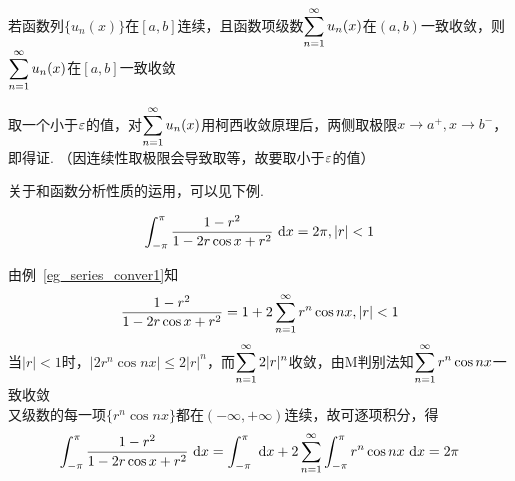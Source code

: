 \begin{example}
若函数列$\{u_n(x)\}$在$[a,b]$连续，且函数项级数$\displaystyle\sum_{n=1}^{\infty}u_n(x)$在$(a,b)$一致收敛，则$\displaystyle\sum_{n=1}^{\infty}u_n(x)$在$[a,b]$一致收敛
\end{example}
\begin{analysis}
取一个小于$\varepsilon$的值，对$\displaystyle\sum_{n=1}^{\infty}u_n(x)$用柯西收敛原理后，两侧取极限$x\to a^+,x\to b^-$，即得证. （因连续性取极限会导致取等，故要取小于$\varepsilon$的值）
\end{analysis}
\par 关于和函数分析性质的运用，可以见下例.
\begin{example}
\[\displaystyle\int_{-\pi}^{\pi}{\dfrac{1-r^2}{1-2r\cos x+r^2}}\,\,\mathrm{d} x=2\pi,|r|<1\]
\end{example}
\begin{analysis}
由例~\ref{eg_series_conver1}知
\[\dfrac{1-r^2}{1-2r\cos x+r^2}=1+2\displaystyle\sum_{n=1}^{\infty}r^n\cos nx,|r|<1\]
当$|r|<1$时，$|2r^n\cos nx|\leq 2|r|^n$，而$\displaystyle\sum_{n=1}^{\infty}2|r|^n$收敛，由M判别法知$\displaystyle\sum_{n=1}^{\infty}r^n\cos nx$一致收敛\\
又级数的每一项$\{r^n\cos nx\}$都在$(-\infty,+\infty)$连续，故可逐项积分，得
\[\displaystyle\int_{-\pi}^{\pi}{\dfrac{1-r^2}{1-2r\cos x+r^2}}\,\,\mathrm{d} x=\displaystyle\int_{-\pi}^{\pi}{}\,\,\mathrm{d} x+2\displaystyle\sum_{n=1}^{\infty}\displaystyle\int_{-\pi}^{\pi}{r^n\cos nx}\,\,\mathrm{d} x=2\pi\]
\end{analysis}